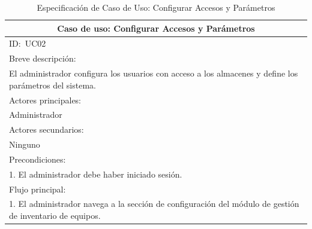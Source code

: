 \documentclass[stu, 12pt, letterpaper, donotrepeattitle, floatsintext, natbib]{apa7}
\begin{document}
\newpage
\begin{longtable}{@{} p{16.5cm} @{}}
    \caption{Especificación de Caso de Uso: Configurar Accesos y Parámetros}\label{tab:UC02}                                                         \\ \toprule
    \multicolumn{1}{c}{Caso de uso: Configurar Accesos y Parámetros}                                                                                 \\ \midrule
    ID:~UC02                                                                                                                                         \\ \midrule
    Breve descripción:                                                                                                                               \\
    El administrador configura los usuarios con acceso a los almacenes y define los parámetros del sistema.                                          \\ \midrule
    Actores principales:                                                                                                                             \\
    Administrador                                                                                                                                    \\ \midrule
    Actores secundarios:                                                                                                                             \\
    Ninguno                                                                                                                                          \\ \midrule
    Precondiciones:                                                                                                                                  \\
    1. El administrador debe haber iniciado sesión.                                                                                                  \\ \midrule
    Flujo principal:                                                                                                                                 \\
    1. El administrador navega a la sección de configuración del módulo de gestión de inventario de equipos.                                         \\

\end{longtable}
\end{document}
